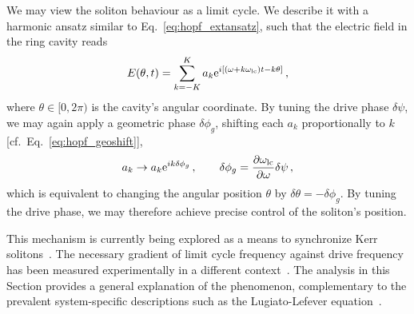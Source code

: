 We may view the soliton behaviour as a limit cycle. We describe it with a harmonic ansatz similar to Eq.~\eqref{eq:hopf_extansatz}, such that the electric field in the ring cavity reads
\begin{equation}
E(\theta, t) = \sum_{k = -K}^{K} a_k {\rm e}^{i \left[\left(\omega + k \omega_{\rm lc} \right)t - k \theta \right]} \,,
\end{equation}
where $\theta \in [0, 2\pi)$ is the cavity's angular coordinate. By tuning the drive phase $\delta \psi$, we may again apply a geometric phase $\delta \phi_g$, shifting each $a_k$ proportionally to $k$ [cf.~Eq.~\eqref{eq:hopf_geoshift}], 
\begin{equation}
a_k \rightarrow a_k {\rm e}^{i k \delta{\phi}_g} \,, \qquad \delta \phi_g = \frac{\partial \omega_{\rm lc}}{\partial \omega} \delta \psi \,,
\end{equation}
which is equivalent to changing the angular position $\theta$ by $\delta \theta = -\delta \phi_g$. By tuning the drive phase, we may therefore achieve precise control of the soliton's position. 

This mechanism is currently being explored as a means to synchronize Kerr solitons~\cite{Jang_2015, Erkintalo_2022}. The necessary gradient of limit cycle frequency against drive frequency has been measured experimentally in a different context~\cite{Bao_2017}. The analysis in this Section provides a general explanation of the phenomenon, complementary to the prevalent system-specific descriptions such as the Lugiato-Lefever equation~\cite{Lugiato_1987}. 